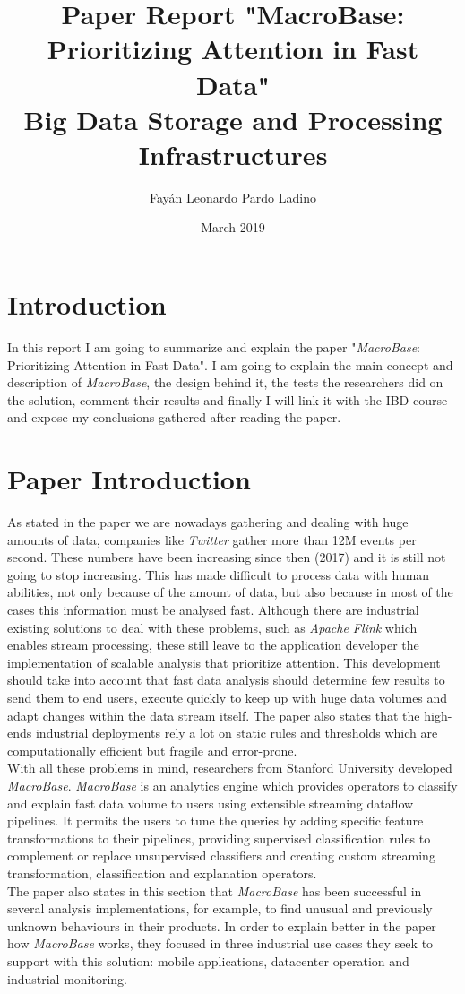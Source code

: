 \documentclass[11pt, titlepage]{article}
\title{Paper Report "MacroBase: Prioritizing Attention in Fast Data" \\ Big Data Storage and Processing Infrastructures}
\author{Fayán Leonardo Pardo Ladino}
\date{March 2019}
\begin{document}
	\maketitle
	\section{Introduction}
	\begin{flushleft}
		In this report I am going to summarize and explain the paper "\textit{MacroBase}: Prioritizing Attention in Fast Data". I am going to explain the main concept and description of \textit{MacroBase}, the design behind it, the tests the researchers did on the solution, comment their results and finally I will link it with the IBD course and expose my conclusions gathered after reading the paper.
	\end{flushleft}
	\section{Paper Introduction}
	\begin{flushleft}
		As stated in the paper we are nowadays gathering and dealing with huge amounts of data, companies like \textit{Twitter} gather more than 12M events per second. These numbers have been increasing since then (2017) and it is still not going to stop increasing. This has made difficult to process data with human abilities, not only because of the amount of data, but also because in most of the cases this information must be analysed fast. Although there are industrial existing solutions to deal with these problems, such as \textit{Apache Flink} which enables stream processing, these still leave to the application developer the implementation of scalable analysis that prioritize attention. This development should take into account that fast data analysis should determine few results to send them to end users, execute quickly to keep up with huge data volumes and adapt changes within the data stream itself. The paper also states that the high-ends industrial deployments rely a lot on static rules and thresholds which are computationally efficient but fragile and error-prone.
		\\With all these problems in mind, researchers from Stanford University developed \textit{MacroBase}. \textit{MacroBase} is an analytics engine which provides operators to classify and explain fast data volume to users using extensible streaming dataflow pipelines. It permits the users to tune the queries by adding specific feature transformations to their pipelines, providing supervised classification rules to complement or replace unsupervised classifiers and creating custom streaming transformation, classification and explanation operators.
		\\The paper also states in this section that \textit{MacroBase} has been successful in several analysis implementations, for example, to find unusual and previously unknown behaviours in their products. In order to explain better in the paper how \textit{MacroBase} works, they focused in three industrial use cases they seek to support with this solution: mobile applications, datacenter operation and industrial monitoring.
	\end{flushleft}
\end{document}
